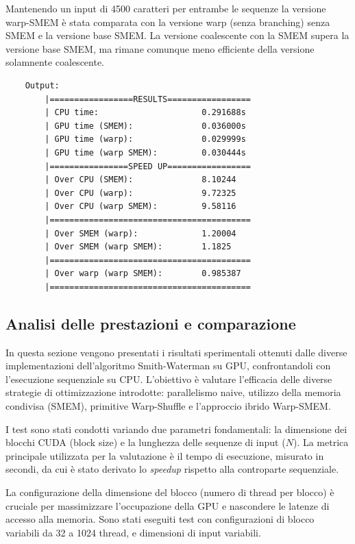 \documentclass[a4paper,12pt]{article}
\begin{document}
Mantenendo un input di 4500 caratteri per entrambe le sequenze la versione warp-SMEM è stata comparata con la versione warp (senza branching) senza SMEM e la versione base SMEM.
La versione coalescente con la SMEM supera la versione base SMEM, ma rimane comunque meno efficiente della versione solamnente coalescente.
\newpage
\begin{lstlisting}
    Output:
        |=================RESULTS=================
        | CPU time:                     0.291688s
        | GPU time (SMEM):              0.036000s
        | GPU time (warp):              0.029999s
        | GPU time (warp SMEM):         0.030444s
        |================SPEED UP=================
        | Over CPU (SMEM):              8.10244
        | Over CPU (warp):              9.72325
        | Over CPU (warp SMEM):         9.58116
        |=========================================
        | Over SMEM (warp):             1.20004
        | Over SMEM (warp SMEM):        1.1825
        |=========================================
        | Over warp (warp SMEM):        0.985387
        |=========================================
\end{lstlisting}

\subsection{Analisi delle prestazioni e comparazione}

In questa sezione vengono presentati i risultati sperimentali ottenuti dalle diverse implementazioni dell'algoritmo Smith-Waterman su GPU, confrontandoli con l'esecuzione sequenziale su CPU. L'obiettivo è valutare l'efficacia delle diverse strategie di ottimizzazione introdotte: parallelismo naive, utilizzo della memoria condivisa (SMEM), primitive Warp-Shuffle e l'approccio ibrido Warp-SMEM.

I test sono stati condotti variando due parametri fondamentali: la dimensione dei blocchi CUDA (block size) e la lunghezza delle sequenze di input ($N$). La metrica principale utilizzata per la valutazione è il tempo di esecuzione, misurato in secondi, da cui è stato derivato lo \textit{speedup} rispetto alla controparte sequenziale.

La configurazione della dimensione del blocco (numero di thread per blocco) è cruciale per massimizzare l'occupazione della GPU e nascondere le latenze di accesso alla memoria. Sono stati eseguiti test con configurazioni di blocco variabili da 32 a 1024 thread, e dimensioni di input variabili.
\end{document}
